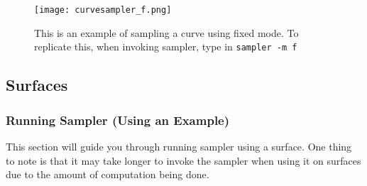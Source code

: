 \begin{figure}[H]
\centering
\texttt{[image: curvesampler\_f.png]}
\caption{This is an example of sampling a curve using fixed mode. To replicate this, when invoking sampler, type in {\tt sampler -m f}}
\end{figure}

\subsection{Surfaces}
\label{sec:sampler_surface}

\subsubsection{Running Sampler (Using an Example)}

This section will guide you through running sampler using a surface. One thing to note is that it may take longer to invoke the sampler when using it on surfaces due to the amount of computation being done.

